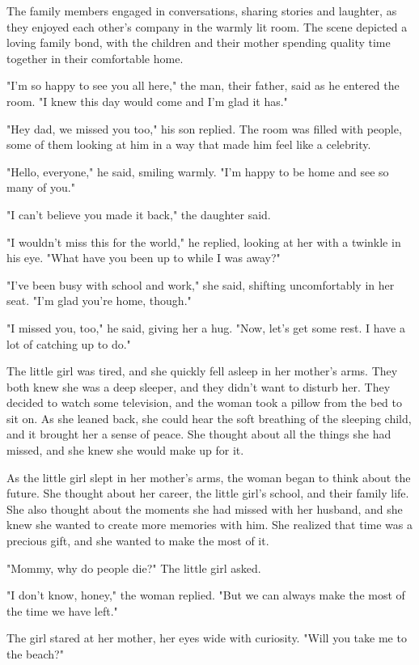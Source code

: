 \documentclass[smalldemyvopaper,11pt,twoside,onecolumn,openright,extrafontsizes]{memoir}
\begin{document}
The family members engaged in conversations, sharing stories and laughter, as they enjoyed each other's company in the warmly lit room. The scene depicted a loving family bond, with the children and their mother spending quality time together in their comfortable home.\par
"I'm so happy to see you all here," the man, their father, said as he entered the room. "I knew this day would come and I'm glad it has."\par
"Hey dad, we missed you too," his son replied. The room was filled with people, some of them looking at him in a way that made him feel like a celebrity.\par
"Hello, everyone," he said, smiling warmly. "I'm happy to be home and see so many of you."\par
"I can't believe you made it back," the daughter said.\par
"I wouldn't miss this for the world," he replied, looking at her with a twinkle in his eye. "What have you been up to while I was away?"\par
"I've been busy with school and work," she said, shifting uncomfortably in her seat. "I'm glad you're home, though."\par
"I missed you, too," he said, giving her a hug. "Now, let's get some rest. I have a lot of catching up to do."\par
The little girl was tired, and she quickly fell asleep in her mother's arms. They both knew she was a deep sleeper, and they didn't want to disturb her. They decided to watch some television, and the woman took a pillow from the bed to sit on. As she leaned back, she could hear the soft breathing of the sleeping child, and it brought her a sense of peace. She thought about all the things she had missed, and she knew she would make up for it.\par
As the little girl slept in her mother's arms, the woman began to think about the future. She thought about her career, the little girl's school, and their family life. She also thought about the moments she had missed with her husband, and she knew she wanted to create more memories with him. She realized that time was a precious gift, and she wanted to make the most of it.\par
"Mommy, why do people die?" The little girl asked.\par
"I don't know, honey," the woman replied. "But we can always make the most of the time we have left."\par
The girl stared at her mother, her eyes wide with curiosity. "Will you take me to the beach?"\par
\end{document}
